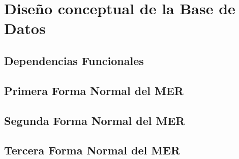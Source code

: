 \section{Diseño conceptual de la Base de Datos}

\subsection{Dependencias Funcionales}

\subsection{Primera Forma Normal del MER}

\subsection{Segunda Forma Normal del MER}

\subsection{Tercera Forma Normal del MER}
